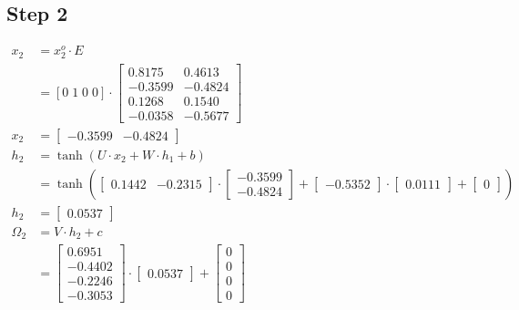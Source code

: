 \documentclass{article}
\begin{document}
\subsection{Step 2}
\begin{align*}
    x_2 & = x^o_2 \cdot E \\
    & =  [0 \; 1\; 0\; 0] \cdot \begin{bmatrix}
  0.8175 & 0.4613 \\
 -0.3599 & -0.4824 \\
  0.1268 & 0.1540 \\
 -0.0358 & -0.5677
\end{bmatrix} \\
    x_2 & = \begin{bmatrix}
  -0.3599 & -0.4824
\end{bmatrix} \\
    h_2 & = \tanh(U \cdot x_2 + W \cdot h_1 + b) \\
    & = \tanh\left(\begin{bmatrix}
  0.1442 & -0.2315
\end{bmatrix} \cdot \begin{bmatrix}
 -0.3599 \\ -0.4824 
\end{bmatrix} + \begin{bmatrix}
 -0.5352
\end{bmatrix} \cdot \begin{bmatrix} 0.0111 \end{bmatrix} + \begin{bmatrix} 0 \end{bmatrix}\right) \\
    h_2 & = \begin{bmatrix} 0.0537 \end{bmatrix} \\
    \Omega_2 & = V \cdot h_2 + c \\
    & = \begin{bmatrix}
  0.6951 \\
 -0.4402 \\
 -0.2246 \\
 -0.3053
\end{bmatrix} \cdot \begin{bmatrix} 0.0537 \end{bmatrix} + \begin{bmatrix} 0 \\ 0 \\ 0 \\ 0 \end{bmatrix} \\

\end{align*}
\end{document}
